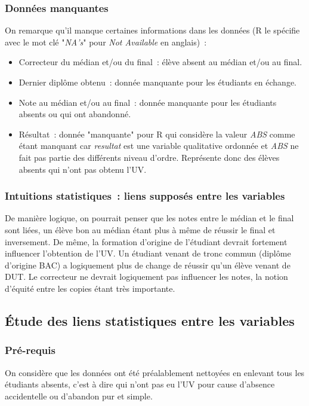 \documentclass[a4paper,10pt]{report}
\begin{document}
\subsubsection{Données manquantes}
On remarque qu'il manque certaines informations dans les données (R le spécifie avec le mot clé "\textit{NA's}" pour \textit{Not Available} en anglais)~:
\begin{itemize}
	\item Correcteur du médian et/ou du final~: élève absent au médian et/ou au final.
	\item Dernier diplôme obtenu~: donnée manquante pour les étudiants en échange.
	\item Note au médian et/ou au final~: donnée manquante pour les étudiants absents ou qui ont abandonné.
	\item Résultat~: donnée "manquante" pour R qui considère la valeur \textit{ABS} comme étant manquant car \textit{resultat} est une variable qualitative ordonnée et \textit{ABS} ne fait pas partie des différents niveau d'ordre. Représente donc des élèves absents qui n'ont pas obtenu l'UV.
\end{itemize}


\subsubsection{Intuitions statistiques~: liens supposés entre les variables}
De manière logique, on pourrait penser que les notes entre le médian et le final sont liées, un élève bon au médian étant plus à même de réussir le final et inversement. De même, la formation d'origine de l'étudiant devrait fortement influencer l'obtention de l'UV. Un étudiant venant de tronc commun (diplôme d'origine BAC) a logiquement plus de change de réussir qu'un élève venant de DUT. Le correcteur ne devrait logiquement pas influencer les notes, la notion d'équité entre les copies étant très importante.




\subsection{Étude des liens statistiques entre les variables}

\subsubsection{Pré-requis}
On considère que les données ont été préalablement nettoyées en enlevant tous les étudiants absents, c'est à dire qui n'ont pas eu l'UV pour cause d'absence accidentelle ou d'abandon pur et simple.
\end{document}
